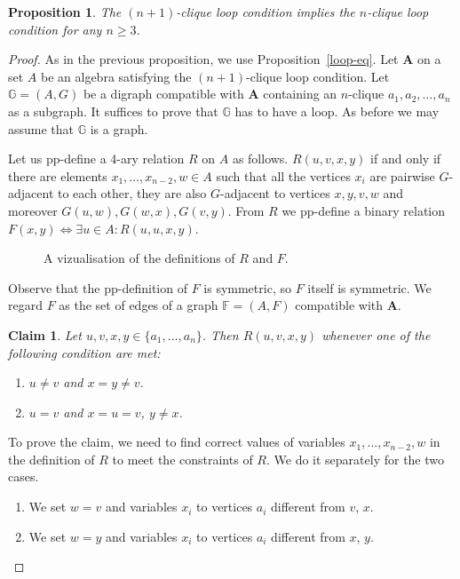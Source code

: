 \documentclass[a4paper]{article}
\def\inkpict#1#2#3{\medskip
\begin{figure}[!ht]
  \def\svgwidth{#1}
  \centering
     
  \caption{#3}
\end{figure}
}
\newcommand{\alg}[1]{\mathbf{#1}}
\newcommand{\relstr}[1]{\mathbb{#1}}
\newtheorem{proposition}{Proposition}
\newtheorem{claim}{Claim}
\begin{document}
\begin{proposition}
\label{smaller_cliques}
The $(n+1)$-clique loop condition implies the $n$-clique loop
condition for any $n\geq 3$.
\end{proposition}
\begin{proof}
As in the previous proposition, we use Proposition~\ref{loop-eq}. Let $\alg A$ on a set $A$
be an algebra satisfying the $(n+1)$-clique loop condition.
Let $\relstr G=(A, G)$ be a digraph
compatible with $\alg A$ containing an $n$-clique
$a_1, a_2, \ldots, a_n$ as a subgraph.
It suffices to prove that $\relstr G$ has to have a loop. 
As before we may assume that $\relstr{G}$ is a graph.

Let us pp-define a 4-ary relation $R$ on $A$ as
follows. $R(u,v,x,y)$ if and
only if there are elements $x_1, \ldots, x_{n-2}, w\in A$ such that
all the vertices $x_i$ are pairwise $G$-adjacent to each other, they are also
$G$-adjacent to vertices $x, y, v, w$ and moreover
$G(u,w), G(w,x), G(v,y)$.
From $R$ we pp-define a binary relation
$F(x,y)\Leftrightarrow\exists u\in A\colon R(u,u,x,y)$.

\inkpict{8cm}{R-F-def}{A vizualisation of the definitions of $R$ and $F$.}

Observe that the pp-definition of $F$ is symmetric, so $F$ itself is
symmetric. We regard $F$ as the set of edges of a graph $\relstr F=(A,F)$ compatible with $\alg A$.

\begin{claim}
  \label{R-description}
  Let $u,v,x,y\in \{a_1, \ldots, a_n\}$. Then $R(u,v,x,y)$ whenever one of the following condition are met:
  \begin{enumerate}
  \item[(a)] $u\neq v$ and $x=y\neq v$.
  \item[(b)] $u=v$ and $x=u=v$, $y\neq x$.
  \end{enumerate}
\end{claim}
To prove the claim, we need to find correct values of variables
$x_1,\ldots, x_{n-2}, w$ in the definition of $R$ to meet the constraints
of $R$. We do it separately for the two cases.
 \begin{enumerate}
 \item[(a)] We set $w=v$ and variables $x_i$ to vertices $a_i$
   different from $v$, $x$.
 \item[(b)] We set $w=y$ and variables $x_i$ to vertices $a_i$
   different from $x$, $y$.
 \end{enumerate}


\end{proof}
\end{document}
